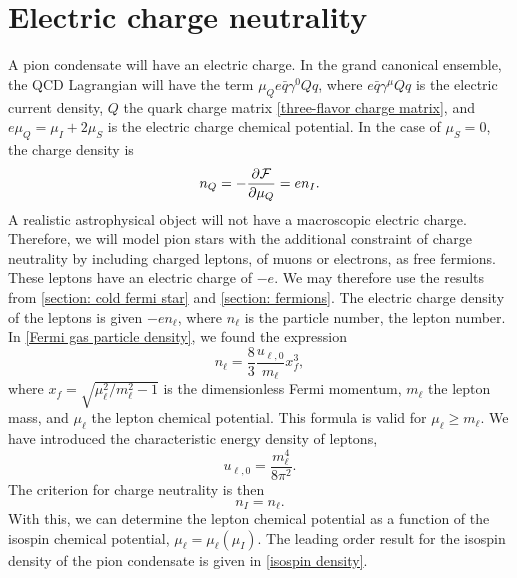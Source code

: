 \section{Electric charge neutrality}
\label{section: charge neturality}


A pion condensate will have an electric charge.
In the grand canonical ensemble, the QCD Lagrangian will have the term  $\mu_Q e\bar q \gamma^0 Q q$, where $e \bar q \gamma^\mu Q q$ is the electric current density, $Q$ the quark charge matrix \autoref{three-flavor charge matrix}, and $e \mu_Q = \mu_I + 2 \mu_S$ is the electric charge chemical potential.
In the case of $\mu_S = 0$, the charge density is
%
\begin{equation}
    n_Q = - \pdv{\mathcal{F}}{\mu_Q} = e n_I.
\end{equation}
%
A realistic astrophysical object will not have a macroscopic electric charge.
Therefore, we will model pion stars with the additional constraint of charge neutrality by including charged leptons, of muons or electrons, as free fermions.
These leptons have an electric charge of $- e$.
We may therefore use the results from \autoref{section: cold fermi star} and \autoref{section: fermions}.
The electric charge density of the leptons is given $- e n_\ell$, where $n_\ell$ is the particle number, the lepton number.
In \autoref{Fermi gas particle density}, we found the expression
%
\begin{equation}
    \label{lepton density}
    n_{\ell} = \frac{8}{3} 
    \frac{u_{\ell, 0}}{m_\ell} x_f^3,
\end{equation}
%
where $x_f = \sqrt{ {\mu_\ell^2}/{m_\ell^2} - 1}$ is the dimensionless Fermi momentum, $m_\ell$ the lepton mass, and $\mu_\ell$ the lepton chemical potential.
This formula is valid for $\mu_\ell \geq m_\ell$.
We have introduced the characteristic energy density of leptons,
%
\begin{equation}
    u_{\ell, 0} = \frac{m^4_\ell}{8 \pi^2}.
\end{equation}
%
The criterion for charge neutrality is then
%
\begin{equation}
    \label{criterion charge neutrality}
    n_I = n_\ell.
\end{equation}
%
With this, we can determine the lepton chemical potential as a function of the isospin chemical potential, $\mu_\ell = \mu_\ell(\mu_I)$.
The leading order result for the isospin density of the pion condensate is given in \autoref{isospin density}.
